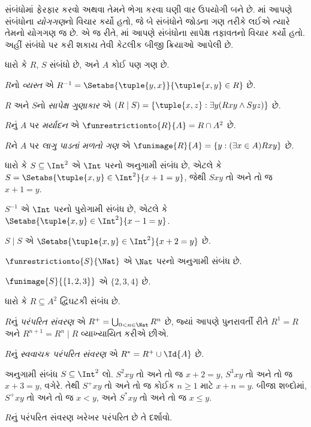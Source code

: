 \documentclass[../../../include/open-logic-section]{subfiles}
\begin{document}

સંબંધોમાં ફેરફાર કરવો અથવા તેમને ભેગા કરવા ઘણી વાર ઉપયોગી
બને છે. માં આપણે
સંબંધોના \emph{યોગગણ}નો વિચાર કર્યો હતો, જે બે સંબંધોને
જોડના ગણ તરીકે લઈએ ત્યારે તેમનો યોગગણ જ છે.
એ જ રીતે, માં
આપણે સંબંધોના સાપેક્ષ તફાવતનો વિચાર કર્યો હતો.
અહીં સંબંધો પર કરી શકાય તેવી કેટલીક બીજી ક્રિયાઓ આપેલી છે.

\begin{defn}
ધારો કે $R$, $S$ સંબંધો છે, અને $A$ કોઈ પણ ગણ છે.

$R$નો \emph{વ્યસ્ત} એ
$R^{-1} = \Setabs{\tuple{y, x}}{\tuple{x, y} \in R}$ છે.

$R$ અને $S$નો \emph{સાપેક્ષ ગુણાકાર} એ
$(R \mid S) = \{\tuple{x, z} : \exists y(Rxy \land Syz)\}$ છે.

$R$નું $A$ પર \emph{મર્યાદન} એ
$\funrestrictionto{R}{A}= R \cap A^2$ છે.

$R$ને $A$ પર \emph{લાગુ પાડતાં મળતો ગણ} એ
$\funimage{R}{A} = \{y : (\exists x \in A)Rxy\}$ છે.
\end{defn}

\begin{ex}
ધારો કે $S \subseteq \Int^2$ એ $\Int$ પરનો અનુગામી સંબંધ છે,
એટલે કે $S = \Setabs{\tuple{x, y} \in \Int^2}{x + 1 = y}$,
જેથી $Sxy$ તો અને તો જ $x + 1 = y$.

$S^{-1}$ એ $\Int$ પરનો પુરોગામી સંબંધ છે,
એટલે કે $\Setabs{\tuple{x,y}\in\Int^2}{x -1 =y}$.

$S\mid S$ એ
$ \Setabs{\tuple{x,y}\in\Int^2}{x + 2 =y}$ છે.

$\funrestrictionto{S}{\Nat}$ એ $\Nat$ પરનો અનુગામી સંબંધ છે.

$\funimage{S}{\{1,2,3\}}$ એ $\{2, 3, 4\}$ છે.
\end{ex}

\begin{defn}[પરંપરિત સંવરણ]ધારો કે $R \subseteq A^2$ દ્વિઘટકી સંબંધ છે.

$R$નું \emph{પરંપરિત સંવરણ} એ
$R^+ = \bigcup_{0 < n \in \Nat} R^n$ છે,
જ્યાં આપણે પુનરાવર્તી રીતે $R^1 = R$ અને
$R^{n+1} = R^n \mid R$ વ્યાખ્યાયિત કરીએ છીએ.

$R$નું \emph{સ્વવાચક પરંપરિત સંવરણ} એ
$R^* = R^+ \cup \Id{A}$ છે.
\end{defn}

\begin{ex}
અનુગામી સંબંધ $S \subseteq \Int^2$ લો.
$S^2xy$ તો અને તો જ $x + 2 = y$,
$S^3xy$ તો અને તો જ $x + 3 = y$, વગેરે.
તેથી $S^+xy$ તો અને તો જ કોઈક $n \geq 1$ માટે
$x + n = y$. બીજા શબ્દોમાં, $S^+xy$ તો અને તો જ $x < y$,
અને $S^*xy$ તો અને તો જ $x \le y$.
\end{ex}

\begin{prob}
$R$નું પરંપરિત સંવરણ ખરેખર પરંપરિત છે તે દર્શાવો.
\end{prob}
\end{document}
